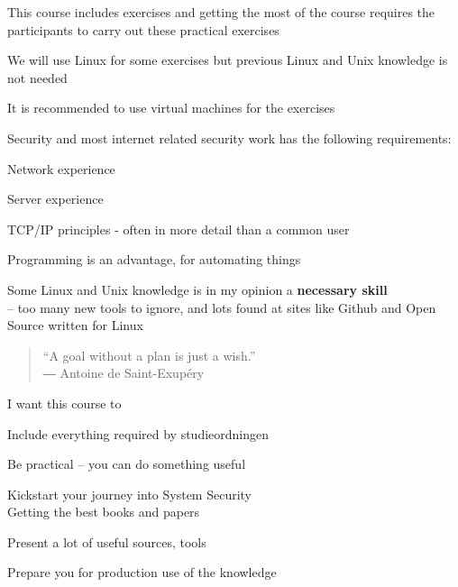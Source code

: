 \documentclass[Screen16to9,17pt]{foils}
\begin{document}
\begin{list1}
\item This course includes exercises and getting the most of the course requires the participants to carry out these practical exercises
\item We will use Linux for some exercises but previous Linux and Unix knowledge is not needed
\item It is recommended to use virtual machines for the exercises
\item Security and most internet related security work has the following requirements:
\begin{list2}
\item Network experience
\item Server experience
\item TCP/IP principles - often in more detail than a common user
\item Programming is an advantage, for automating things
\item Some Linux and Unix knowledge is in my opinion a {\bf necessary skill}\\
-- too many new tools to ignore, and lots found at sites like Github and Open Source written for Linux
\end{list2}
\end{list1}




\begin{quote}
  “A goal without a plan is just a wish.”\\
  ― Antoine de Saint-Exupéry
\end{quote}

I want this course to
\begin{list2}
\item Include everything required by studieordningen
\item Be practical -- you can do something useful
\item Kickstart your journey into System Security\\
Getting the best books and papers
\item Present a lot of useful sources, tools
\item Prepare you for production use of the knowledge
\end{list2}





\end{document}
